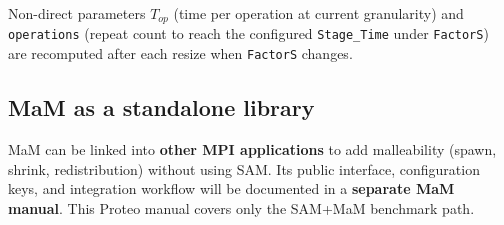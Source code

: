 Non-direct parameters \texttt{$T_{op}$} (time per operation at current granularity) and \texttt{operations} (repeat count to reach the configured \texttt{Stage\_Time} under \texttt{FactorS}) are recomputed after each resize when \texttt{FactorS} changes.

\subsection{MaM as a standalone library}
\label{subsection:mam-library}

MaM can be linked into \textbf{other MPI applications} to add malleability (spawn, shrink, redistribution) without using SAM. Its public interface, configuration keys, and integration workflow will be documented in a \textbf{separate MaM manual}. This Proteo manual covers only the SAM+MaM benchmark path.
